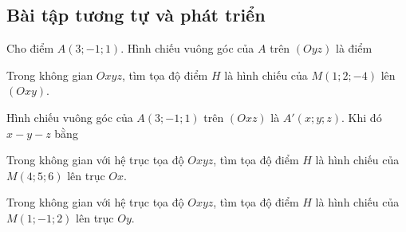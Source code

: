 \subsection{Bài tập tương tự và phát triển}
\setcounter{ex}{0}
\begin{ex}%
	Cho điểm $A(3;-1;1)$. Hình chiếu vuông góc của $A$ trên $(Oyz)$ là điểm
\end{ex}
\begin{ex}%
	Trong không gian $Oxyz$, tìm tọa độ điểm $H$ là hình chiếu của $M(1;2;-4)$ lên $(Oxy)$.
\end{ex}
\begin{ex}%
	Hình chiếu vuông góc của $A(3;-1;1)$ trên $(Oxz)$ là $A'(x;y;z)$. Khi đó $x-y-z$ bằng
\end{ex}
\begin{ex}%
	Trong không gian với hệ trục tọa độ  $Oxyz$, tìm tọa độ điểm $H$ là hình chiếu của $M(4;5;6)$ lên trục $Ox$.
\end{ex}
\begin{ex}%
	Trong không gian với hệ trục tọa độ  $Oxyz$, tìm tọa độ điểm $H$ là hình chiếu của $M(1;-1;2)$ lên trục $Oy$.
\end{ex}

